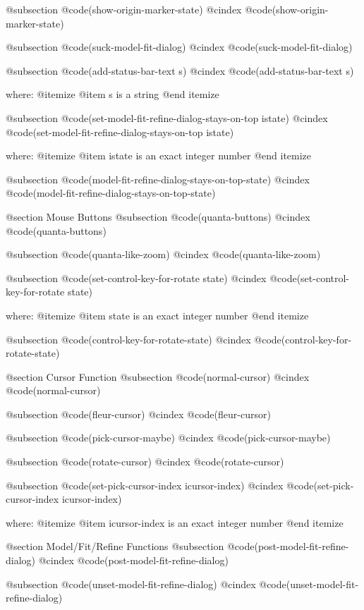 @subsection @code{(show-origin-marker-state)}
@cindex @code{(show-origin-marker-state)}
 
@subsection @code{(suck-model-fit-dialog)}
@cindex @code{(suck-model-fit-dialog)}
 
@subsection @code{(add-status-bar-text s)}
@cindex @code{(add-status-bar-text s)}
 
where: 
 @itemize 
     @item s is a string
 @end itemize


@subsection @code{(set-model-fit-refine-dialog-stays-on-top istate)}
@cindex @code{(set-model-fit-refine-dialog-stays-on-top istate)}
 
where: 
 @itemize 
     @item istate is an exact integer number
 @end itemize


@subsection @code{(model-fit-refine-dialog-stays-on-top-state)}
@cindex @code{(model-fit-refine-dialog-stays-on-top-state)}
 

@section Mouse Buttons 
@subsection @code{(quanta-buttons)}
@cindex @code{(quanta-buttons)}
 
@subsection @code{(quanta-like-zoom)}
@cindex @code{(quanta-like-zoom)}
 
@subsection @code{(set-control-key-for-rotate state)}
@cindex @code{(set-control-key-for-rotate state)}
 
where: 
 @itemize 
     @item state is an exact integer number
 @end itemize


@subsection @code{(control-key-for-rotate-state)}
@cindex @code{(control-key-for-rotate-state)}
 

@section Cursor Function 
@subsection @code{(normal-cursor)}
@cindex @code{(normal-cursor)}
 
@subsection @code{(fleur-cursor)}
@cindex @code{(fleur-cursor)}
 
@subsection @code{(pick-cursor-maybe)}
@cindex @code{(pick-cursor-maybe)}
 
@subsection @code{(rotate-cursor)}
@cindex @code{(rotate-cursor)}
 
@subsection @code{(set-pick-cursor-index icursor-index)}
@cindex @code{(set-pick-cursor-index icursor-index)}
 
where: 
 @itemize 
     @item icursor-index is an exact integer number
 @end itemize



@section Model/Fit/Refine Functions 
@subsection @code{(post-model-fit-refine-dialog)}
@cindex @code{(post-model-fit-refine-dialog)}
 
@subsection @code{(unset-model-fit-refine-dialog)}
@cindex @code{(unset-model-fit-refine-dialog)}
 
